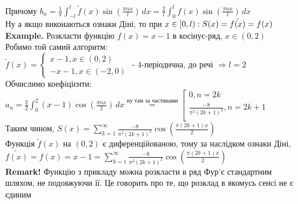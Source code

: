\documentclass[a4paper, 10pt]{article}
\def\hugespace{\vspace{5mm} \\}
\theoremstyle{theoremdd}
\theoremstyle{theoremdd}
\theoremstyle{theoremdd}
\theoremstyle{theoremdd}
\theoremstyle{theoremdd}
\theoremstyle{theoremdd}
\theoremstyle{theoremdd}
\theoremstyle{theoremdd}
\begin{document}
Причому $b_n = \displaystyle \frac{1}{\pi} \int_{-l}^{l} \tilde{f}(x) \sin \left( \frac{\pi n x}{l} \right) \,dx = \frac{2}{l} \int_0^l f(x) \sin \left( \frac{\pi n x}{l} \right)\,dx$\\
Ну а якщо виконаються ознаки Діні, то при $x \in [0,l): \\ S(x) = \tilde{f(x)} = f(x)$
\hugespace
\textbf{Example. } Розкласти функцію $f(x) = x-1$ в косінус-ряд, $x \in (0,2)$\\
Робимо той самий алгоритм:\\
$\tilde{f}(x) = \begin{cases} x-1, x \in (0,2) \\ -x-1, x \in (-2,0) \end{cases}$ - $4$-періодична, до речі $\Rightarrow l =2$ \\
Обчислимо коефіцієнти:\\
$\displaystyle a_n = \frac{2}{2} \int_0^2 (x-1)\cos \left(\frac{\pi n x}{2} \right)\,dx \overset{\textrm{ну там за частинами}}{=} \left[ 
      \begin{gathered} 
        0, n = 2k \\ 
        \frac{-8}{\pi^2(2k+1)^2} , n = 2k+1 \\ 
      \end{gathered} 
\right.$\\
Таким чином, $S(x) = \displaystyle \sum_{k=1}^{\infty} \frac{-8}{\pi^2(2k+1)^2} \cos \left(\frac{\pi (2k+1) x}{2} \right)$\\
Функція $\tilde{f}(x)$ на $(0,2)$ є диференційованою, тому за наслідком ознаки Діні,\\
$\tilde{f(x)} = f(x) = x-1 = \displaystyle \sum_{k=1}^{\infty} \frac{-8}{\pi^2(2k+1)^2} \cos \left(\frac{\pi (2k+1) x}{2} \right)$\\
\textbf{Remark!} Функцію з прикладу можна розкласти в ряд Фур'є стандартним шляхом, не подовжуючи її. Це говорить про те, що розклад в якомусь сенсі не є єдиним
\hugespace
\end{document}
